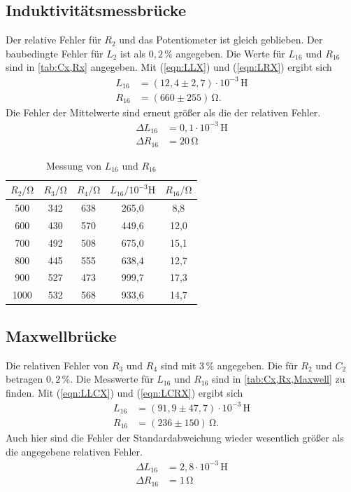 \documentclass[
  bibliography=totoc,     %
  captions=tableheading,  %
  titlepage=firstiscover, %
]{scrartcl}
\begin{document}
  \subsection{Induktivitätsmessbrücke}
  Der relative Fehler für $R_2$ und das Potentiometer ist gleich geblieben. Der baubedingte Fehler für $L_2$ ist als $0,2\,\%$ angegeben.
  Die Werte für $L_{16}$ und $R_{16}$ sind in \autoref{tab:Cx,Rx} angegeben. Mit (\autoref{eqn:LLX}) und (\autoref{eqn:LRX}) ergibt sich
  \begin{align*}
    L_{16} &= (12,4 \pm 2,7)\cdot 10^{-3} \,\unit{\henry} \\
    R_{16} &= (660 \pm 255)\,\unit{\ohm}.
  \end{align*}
  Die Fehler der Mittelwerte sind erneut größer als die der relativen Fehler.
  \begin{align*}
    \Delta L_{16} &= 0,1\cdot 10^{-3}\,\unit{\henry} \\
    \Delta R_{16} &= 20\,\unit{\ohm}
  \end{align*}

  \begin{table}
    \centering
    \caption{Messung von $L_{16}$ und $R_{16}$}
    \label{tab:Cx,Rx}
    \begin{tabular}{c c c c c}
      \toprule
      $R_2/\unit{\ohm}$ & $R_3/\unit{\ohm}$ & $R_4/\unit{\ohm}$ & $L_{16}/10^{-3}\unit{\henry}$ & $R_{16}/\unit{\ohm}$ \\
      \midrule
      500 & 342 & 638 &  265,0 &  8,8 \\
      600 & 430 & 570 &  449,6 & 12,0 \\
      700 & 492 & 508 &  675,0 & 15,1 \\
      800 & 445 & 555 &  638,4 & 12,7 \\
      900 & 527 & 473 & 999,7 & 17,3 \\
      1000 & 532 & 568 &  933,6 & 14,7 \\
      \bottomrule
    \end{tabular}
  \end{table}
  \FloatBarrier

  \subsection{Maxwellbrücke}
  Die relativen Fehler von $R_3$ und $R_4$ sind mit $3\,\% $ angegeben. Die für $R_2$ und $C_2$ betragen $0,2\,\%$.
  Die Messwerte für $L_{16}$ und $R_{16}$ sind in \autoref{tab:Cx,Rx,Maxwell} zu finden. Mit (\autoref{eqn:LLCX}) und (\autoref{eqn:LCRX}) ergibt sich
  \begin{align*}
    L_{16} &= (91,9 \pm 47,7)\cdot 10^{-3} \,\unit{\henry} \\
    R_{16} &= (236 \pm 150)\,\unit{\ohm}.
  \end{align*}
  Auch hier sind die Fehler der Standardabweichung wieder wesentlich größer als die angegebene relativen Fehler.
  \begin{align*}
    \Delta L_{16} &= 2,8\cdot 10^{-3}\,\unit{\henry} \\
    \Delta R_{16} &= 1\,\unit{\ohm}
  \end{align*}
\end{document}
